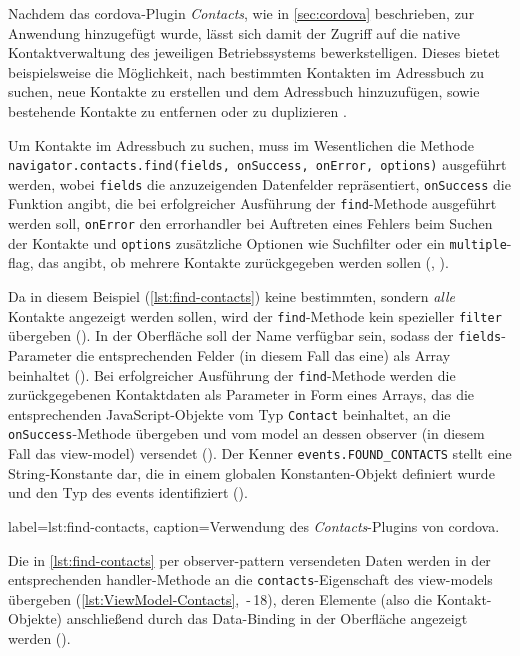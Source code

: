 Nachdem das \gls{cordova}-Plugin \emph{Contacts}, wie in \autoref{sec:cordova} beschrieben, zur Anwendung hinzugefügt wurde, lässt sich damit der Zugriff auf die native Kontaktverwaltung des jeweiligen Betriebssystems bewerkstelligen.
Dieses bietet beispielsweise die Möglichkeit, nach bestimmten Kontakten im Adressbuch zu suchen, neue Kontakte zu erstellen und dem Adressbuch hinzuzufügen, sowie bestehende Kontakte zu entfernen oder zu duplizieren \cite{Cordova_Plugin_Registry_Contacts}.

Um Kontakte im Adressbuch zu suchen, muss im Wesentlichen die Methode \lstinline|navigator.contacts.find(fields, onSuccess, onError, options)| ausgeführt werden, wobei \lstinline|fields| die anzuzeigenden Datenfelder repräsentiert, \lstinline|onSuccess| die Funktion angibt, die bei erfolgreicher Ausführung der \lstinline|find|-Methode ausgeführt werden soll, \lstinline|onError| den \gls{errorhandler} bei Auftreten eines Fehlers beim Suchen der Kontakte und \lstinline|options| zusätzliche Optionen wie Suchfilter oder ein \lstinline|multiple|-\gls{flag}, das angibt, ob mehrere Kontakte zurückgegeben werden sollen (, ).

Da in diesem Beispiel (\autoref{lst:find-contacts}) keine bestimmten, sondern \emph{alle} Kontakte angezeigt werden sollen, wird der \lstinline|find|-Methode kein spezieller \lstinline|filter| übergeben (). In der Oberfläche soll der Name verfügbar sein, sodass der \lstinline|fields|-Parameter die entsprechenden Felder (in diesem Fall das eine) als Array beinhaltet (). Bei erfolgreicher Ausführung der \lstinline|find|-Methode werden die zurückgegebenen Kontaktdaten als Parameter in Form eines Arrays, das die entsprechenden JavaScript-Objekte vom Typ \lstinline|Contact| beinhaltet, an die \lstinline|onSuccess|-Methode übergeben und vom \gls{model} an dessen \gls{observer} (in diesem Fall das \gls{view-model}) versendet (). Der Kenner \lstinline|events.FOUND_CONTACTS| stellt eine String-Konstante dar, die in einem globalen Konstanten-Objekt definiert wurde und den Typ des \glspl{event} identifiziert ().

	 { label=lst:find-contacts, caption={Verwendung des \emph{Contacts}-Plugins von \gls{cordova}.}}

Die in \autoref{lst:find-contacts} per \gls{observer-pattern} versendeten Daten werden in der entsprechenden \gls{handler}-Methode an die \lstinline|contacts|-Eigenschaft des \glspl{view-model} übergeben (\autoref{lst:ViewModel-Contacts}, \,-\,18), deren Elemente (also die Kontakt-Objekte) anschließend durch das Data-Binding in der Oberfläche angezeigt werden (\su).

